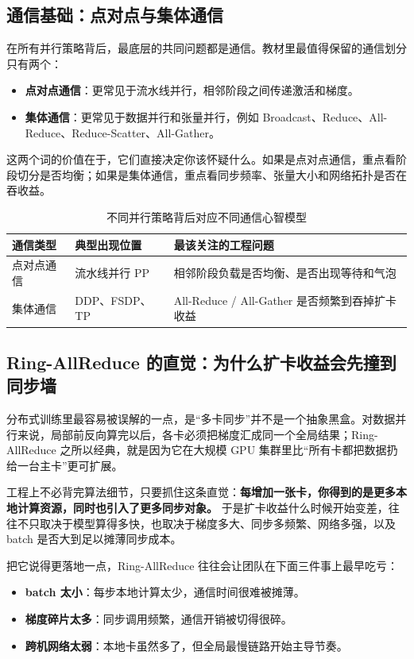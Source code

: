 \subsection{通信基础：点对点与集体通信}
在所有并行策略背后，最底层的共同问题都是通信。教材里最值得保留的通信划分只有两个：
\begin{itemize}
  \item \textbf{点对点通信}：更常见于流水线并行，相邻阶段之间传递激活和梯度。
  \item \textbf{集体通信}：更常见于数据并行和张量并行，例如 Broadcast、Reduce、All-Reduce、Reduce-Scatter、All-Gather。
\end{itemize}

这两个词的价值在于，它们直接决定你该怀疑什么。如果是点对点通信，重点看阶段切分是否均衡；如果是集体通信，重点看同步频率、张量大小和网络拓扑是否在吞收益。

\begin{table}[H]
\centering
\small
\begin{tabularx}{\textwidth}{>{\raggedright\arraybackslash}p{2.8cm}>{\raggedright\arraybackslash}p{3.4cm}>{\raggedright\arraybackslash}X}
\toprule
\textbf{通信类型} & \textbf{典型出现位置} & \textbf{最该关注的工程问题} \\
\midrule
点对点通信 & 流水线并行 PP & 相邻阶段负载是否均衡、是否出现等待和气泡 \\
集体通信 & DDP、FSDP、TP & All-Reduce / All-Gather 是否频繁到吞掉扩卡收益 \\
\bottomrule
\end{tabularx}
\caption{不同并行策略背后对应不同通信心智模型}
\label{tab:distributed-communication}
\end{table}

\subsection{Ring-AllReduce 的直觉：为什么扩卡收益会先撞到同步墙}
分布式训练里最容易被误解的一点，是“多卡同步”并不是一个抽象黑盒。对数据并行来说，局部前反向算完以后，各卡必须把梯度汇成同一个全局结果；Ring-AllReduce 之所以经典，就是因为它在大规模 GPU 集群里比“所有卡都把数据扔给一台主卡”更可扩展。

工程上不必背完算法细节，只要抓住这条直觉：\textbf{每增加一张卡，你得到的是更多本地计算资源，同时也引入了更多同步对象。} 于是扩卡收益什么时候开始变差，往往不只取决于模型算得多快，也取决于梯度多大、同步多频繁、网络多强，以及 batch 是否大到足以摊薄同步成本。

把它说得更落地一点，Ring-AllReduce 往往会让团队在下面三件事上最早吃亏：
\begin{itemize}
  \item \textbf{batch 太小}：每步本地计算太少，通信时间很难被摊薄。
  \item \textbf{梯度碎片太多}：同步调用频繁，通信开销被切得很碎。
  \item \textbf{跨机网络太弱}：本地卡虽然多了，但全局最慢链路开始主导节奏。
\end{itemize}

